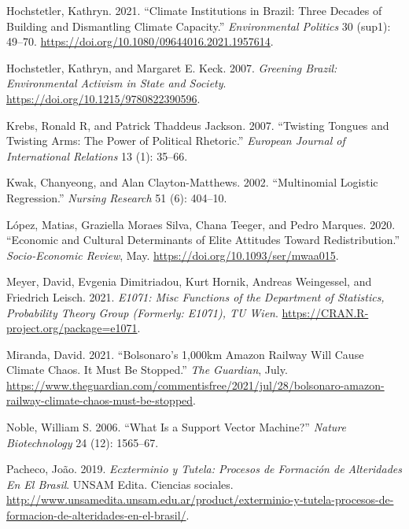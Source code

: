 \documentclass[
]{article}
\newlength{\cslhangindent}
\newlength{\cslentryspacingunit} %
\newenvironment{CSLReferences}[2] %
 {%
  \setlength{\parindent}{0pt}
  \ifodd #1
  \let\oldpar\par
  \def\par{\hangindent=\cslhangindent\oldpar}
  \fi
  \setlength{\parskip}{#2\cslentryspacingunit}
 }%
 {}
\begin{document}
\begin{CSLReferences}{1}{0}
\leavevmode{}%
Hochstetler, Kathryn. 2021. {``Climate Institutions in Brazil: Three
Decades of Building and Dismantling Climate Capacity.''}
\emph{Environmental Politics} 30 (sup1): 49--70.
\url{https://doi.org/10.1080/09644016.2021.1957614}.

\leavevmode{}%
Hochstetler, Kathryn, and Margaret E. Keck. 2007. \emph{Greening Brazil:
Environmental Activism in State and Society}.
\url{https://doi.org/10.1215/9780822390596}.

\leavevmode{}%
Krebs, Ronald R, and Patrick Thaddeus Jackson. 2007. {``Twisting Tongues
and Twisting Arms: The Power of Political Rhetoric.''} \emph{European
Journal of International Relations} 13 (1): 35--66.

\leavevmode{}%
Kwak, Chanyeong, and Alan Clayton-Matthews. 2002. {``Multinomial
Logistic Regression.''} \emph{Nursing Research} 51 (6): 404--10.

\leavevmode{}%
López, Matias, Graziella Moraes Silva, Chana Teeger, and Pedro Marques.
2020. {``Economic and Cultural Determinants of Elite Attitudes Toward
Redistribution.''} \emph{Socio-Economic Review}, May.
\url{https://doi.org/10.1093/ser/mwaa015}.

\leavevmode{}%
Meyer, David, Evgenia Dimitriadou, Kurt Hornik, Andreas Weingessel, and
Friedrich Leisch. 2021. \emph{E1071: Misc Functions of the Department of
Statistics, Probability Theory Group (Formerly: E1071), TU Wien}.
\url{https://CRAN.R-project.org/package=e1071}.

\leavevmode{}%
Miranda, David. 2021. {``Bolsonaro{'}s 1,000km Amazon Railway Will Cause
Climate Chaos. It Must Be Stopped.''} \emph{The Guardian}, July.
\url{https://www.theguardian.com/commentisfree/2021/jul/28/bolsonaro-amazon-railway-climate-chaos-must-be-stopped}.

\leavevmode{}%
Noble, William S. 2006. {``What Is a Support Vector Machine?''}
\emph{Nature Biotechnology} 24 (12): 1565--67.

\leavevmode{}%
Pacheco, João. 2019. \emph{Ecxterminio y Tutela: Procesos de Formación
de Alteridades En El Brasil}. UNSAM Edita. Ciencias sociales.
\url{http://www.unsamedita.unsam.edu.ar/product/exterminio-y-tutela-procesos-de-formacion-de-alteridades-en-el-brasil/}.


\end{CSLReferences}
\end{document}
